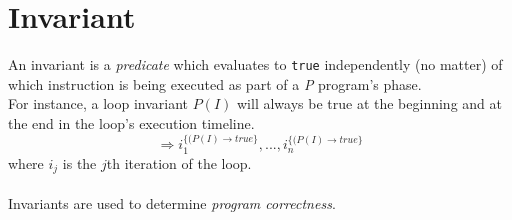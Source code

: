 \documentclass{article}
\begin{document}
 \section*{Invariant}
 
 An invariant is a \textsl{predicate} which evaluates to \texttt{true} independently (no matter) of which instruction
 is being executed as part of a \textsl{P} program's phase. 
 \\
 For instance, a loop invariant $P(I)$ will always be true 
 at the beginning and at the end in the loop's execution timeline.
 $$\Rightarrow i_1^{\{(P(I) \rightarrow true \}} , ..., i_n^{\{(P(I) \rightarrow true \}}$$
 where $i_j$ is the $j$th iteration of the loop.
 \\
 \\
 Invariants are used to determine \textsl{program correctness}.
 
\end{document}
